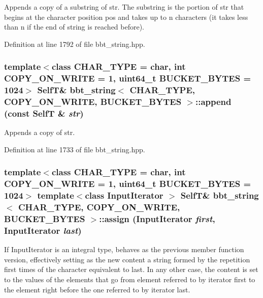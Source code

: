 Appends a copy of a substring of str. The substring is the portion of str that begins at the character position pos and takes up to n characters (it takes less than n if the end of string is reached before). 

Definition at line 1792 of file bbt\_\-string.hpp.\hypertarget{classbbt__string_b180cabdee6b7d393fc4e32230445051}{
\subsubsection[{append}]{\setlength{\rightskip}{0pt plus 5cm}template$<$class CHAR\_\-TYPE  = char, int COPY\_\-ON\_\-WRITE = 1, uint64\_\-t BUCKET\_\-BYTES = 1024$>$ {\bf SelfT}\& {\bf bbt\_\-string}$<$ CHAR\_\-TYPE, COPY\_\-ON\_\-WRITE, BUCKET\_\-BYTES $>$::append (const {\bf SelfT} \& {\em str})}}
\label{classbbt__string_b180cabdee6b7d393fc4e32230445051}


Appends a copy of str. 

Definition at line 1733 of file bbt\_\-string.hpp.\hypertarget{classbbt__string_fa0f90cc47b7fb7c8d4bf8a5aab3658d}{
\subsubsection[{assign}]{\setlength{\rightskip}{0pt plus 5cm}template$<$class CHAR\_\-TYPE  = char, int COPY\_\-ON\_\-WRITE = 1, uint64\_\-t BUCKET\_\-BYTES = 1024$>$ template$<$class InputIterator $>$ {\bf SelfT}\& {\bf bbt\_\-string}$<$ CHAR\_\-TYPE, COPY\_\-ON\_\-WRITE, BUCKET\_\-BYTES $>$::assign (InputIterator {\em first}, \/  InputIterator {\em last})}}
\label{classbbt__string_fa0f90cc47b7fb7c8d4bf8a5aab3658d}


If InputIterator is an integral type, behaves as the previous member function version, effectively setting as the new content a string formed by the repetition first times of the character equivalent to last. In any other case, the content is set to the values of the elements that go from element referred to by iterator first to the element right before the one referred to by iterator last. 

